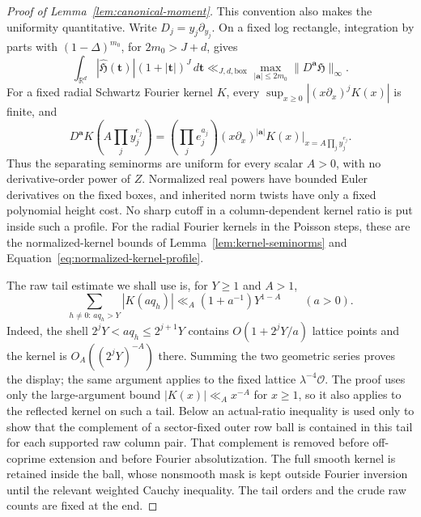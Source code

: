 \documentclass[11pt,a4paper]{article}
\numberwithin{equation}{section}
\numberwithin{figure}{section}
\theoremstyle{definition}
\theoremstyle{remark}
\begin{document}
\begin{proof}[Proof of Lemma~\ref{lem:canonical-moment}]
This convention also makes the uniformity quantitative.  Write
\(D_j=y_j\partial_{y_j}\).  On a fixed log rectangle, integration by
parts with \((1-\Delta)^{m_0}\), for \(2m_0>J+d\), gives
\begin{equation}\label{eq:inverse-fourier-moment}
 \int_{\mathbb R^d}|\widehat{\mathfrak H}(\boldsymbol t)|
        (1+|\boldsymbol t|)^J\,d\boldsymbol t
 \ll_{J,d,\mathrm{box}}\max_{|\boldsymbol a|\le2m_0}
             \|D^{\boldsymbol a}\mathfrak H\|_\infty.
\end{equation}
For a fixed radial Schwartz Fourier kernel \(K\), every
\(\sup_{x\ge0}|(x\partial_x)^jK(x)|\) is finite, and
\[
 D^{\boldsymbol a}K\!\left(A\prod_jy_j^{e_j}\right)
 =\left(\prod_je_j^{a_j}\right)
   (x\partial_x)^{|\boldsymbol a|}K(x)
       \big|_{x=A\prod_jy_j^{e_j}}.
\]
Thus the separating seminorms are uniform for every scalar \(A>0\),
with no derivative-order power of \(Z\).  Normalized real powers have
bounded Euler derivatives on the fixed boxes, and inherited norm twists
have only a fixed polynomial height cost.  No sharp cutoff in a
column-dependent kernel ratio is put inside such a profile.
For the radial Fourier kernels in the Poisson steps, these are the
normalized-kernel bounds of Lemma~\ref{lem:kernel-seminorms} and
Equation~\eqref{eq:normalized-kernel-profile}.

The raw tail estimate we shall use is, for \(Y\ge1\) and \(A>1\),
\begin{equation}\label{eq:inverse-raw-tail}
 \sum_{h\ne0:\,a q_h>Y}|K(aq_h)|
 \ll_A(1+a^{-1})Y^{1-A}\qquad(a>0).
\end{equation}
Indeed, the shell \(2^jY<a q_h\le2^{j+1}Y\) contains
\(O(1+2^jY/a)\) lattice points and the kernel is
\(O_A((2^jY)^{-A})\) there.  Summing the two geometric series proves the
display; the same argument applies to the fixed lattice
\(\lambda^{-4}\mathcal O\).  The proof uses only the large-argument
bound \(|K(x)|\ll_Ax^{-A}\) for \(x\ge1\), so it also applies to the
reflected kernel on such a tail.  Below an actual-ratio inequality is used only
to show that the complement of a sector-fixed outer row ball is contained
in this tail for each supported raw column pair.  That complement is
removed before off-coprime extension and before Fourier absolutization.
The full smooth kernel is retained inside the ball, whose nonsmooth mask
is kept outside Fourier inversion until the relevant weighted Cauchy
inequality.  The tail orders and the crude raw counts are fixed at the end.


\end{proof}
\end{document}
